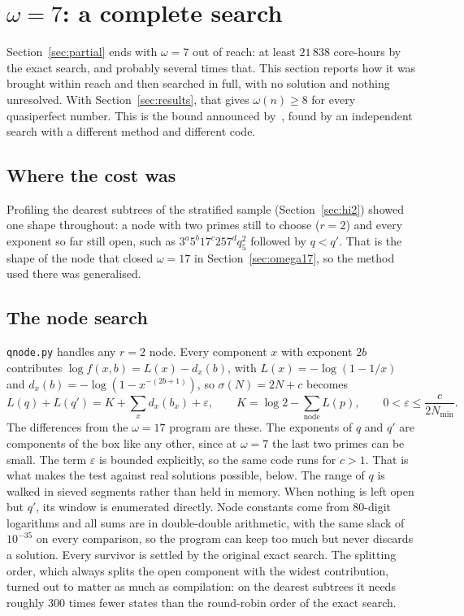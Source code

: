 \documentclass[11pt]{amsart}
\theoremstyle{remark}
\begin{document}
\section{\texorpdfstring{$\omega = 7$}{omega = 7}: a complete search}\label{sec:omega7}
Section~\ref{sec:partial} ends with $\omega = 7$ out of reach: at least
$21\,838$ core-hours by the exact search, and probably several times that. This
section reports how it was brought within reach and then searched in full, with
no solution and nothing unresolved. With Section~\ref{sec:results}, that gives
$\omega(n) \ge 8$ for every quasiperfect number. This is the bound announced
by~\cite{tty}, found by an independent search with a different method and
different code.

\subsection{Where the cost was}
Profiling the dearest subtrees of the stratified sample (Section~\ref{sec:hi2})
showed one shape throughout: a node with two primes still to choose ($r = 2$)
and every exponent so far still open, such as
$3^{a} 5^{b} 17^{c} 257^{d} q_5^{2}$ followed by $q < q'$. That is the shape of
the node that closed $\omega = 17$ in Section~\ref{sec:omega17}, so the method
used there was generalised.

\subsection{The node search}\label{sec:qnode}
\texttt{qnode.py} handles any $r = 2$ node. Every component $x$ with exponent
$2b$ contributes $\log f(x, b) = L(x) - d_x(b)$, with $L(x) = -\log(1 - 1/x)$
and $d_x(b) = -\log(1 - x^{-(2b+1)})$, so $\sigma(N) = 2N + c$ becomes
\[
  L(q) + L(q') = K + \sum_x d_x(b_x) + \varepsilon, \qquad
  K = \log 2 - \sum_{\text{node}} L(p), \qquad
  0 < \varepsilon \le \frac{c}{2 N_{\min}}.
\]
The differences from the $\omega = 17$ program are these. The exponents of $q$
and $q'$ are components of the box like any other, since at $\omega = 7$ the last
two primes can be small. The term $\varepsilon$ is bounded explicitly, so the same
code runs for $c > 1$. That is what makes the test against real solutions
possible, below. The range of $q$ is walked in sieved segments rather than held
in memory. When nothing is left open but $q'$, its window is enumerated
directly. Node constants come from $80$-digit logarithms and all sums are in
double-double arithmetic, with the same slack of $10^{-35}$ on every comparison,
so the program can keep too much but never discards a solution. Every survivor
is settled by the original exact search. The splitting order, which always
splits the open component with the widest contribution, turned out to matter
as much as compilation: on the dearest subtrees it needs roughly $300$ times
fewer states than the round-robin order of the exact search.
\end{document}
